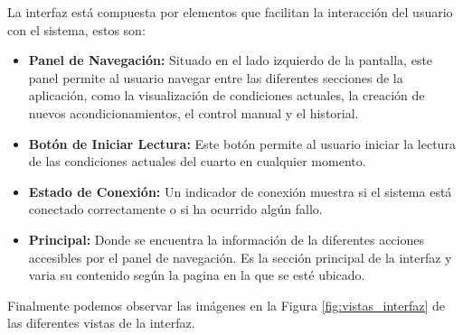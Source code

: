 La interfaz está compuesta por elementos que facilitan la interacción del usuario con el sistema, estos son: \\

\begin{itemize}[label={}, leftmargin=0pt]
    \item \textbf{Panel de Navegación:} Situado en el lado izquierdo de la pantalla, este panel permite al usuario navegar entre las diferentes secciones de la aplicación, como la visualización de condiciones actuales, la creación de nuevos acondicionamientos, el control manual y el historial.
    \item \textbf{Botón de Iniciar Lectura:} Este botón permite al usuario iniciar la lectura de las condiciones actuales del cuarto en cualquier momento.
    \item \textbf{Estado de Conexión:} Un indicador de conexión muestra si el sistema está conectado correctamente o si ha ocurrido algún fallo.
    \item \textbf{Principal:} Donde se encuentra la información de la diferentes acciones accesibles por el panel de navegación. Es la sección principal de la interfaz y varia su contenido según la pagina en la que se esté ubicado.
\end{itemize}

Finalmente podemos observar las imágenes en la Figura \ref{fig:vistas_interfaz} de las diferentes vistas de la interfaz. \\

